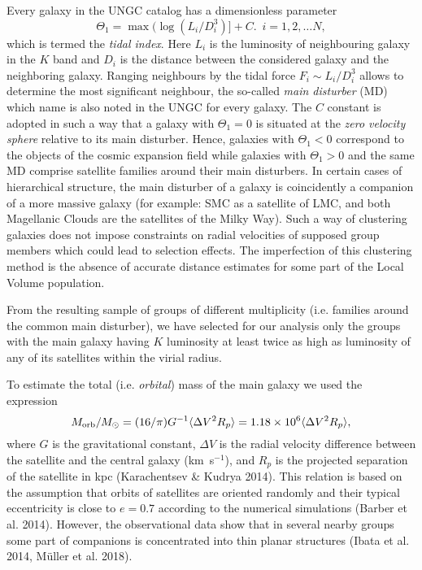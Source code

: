 \documentclass[proof]{WileyASNA-v1}
\begin{document}
Every galaxy in the UNGC catalog has a dimensionless parameter
$$\Theta_1=\max(\log(L_i/D_i^3)]+C. \,\,\, i= 1, 2, \ldots N,$$
which is termed the {\itshape tidal index}. Here $L_i$ is the luminosity of
neighbouring galaxy in the $K$ band and $D_i$ is the distance between the
considered galaxy and the neighboring galaxy. Ranging neighbours by the tidal
force $F_i\sim L_i/D_i^3$ allows to determine the most significant neighbour,
the so-called {\itshape main disturber} (MD) which name is also noted in the
UNGC for every galaxy. The $C$ constant is adopted in such a way that a galaxy
with $\Theta_1=0$ is situated at the {\itshape zero velocity sphere} relative to
its main disturber. Hence, galaxies with $\Theta_1<0$ correspond to the objects
of the cosmic expansion field while galaxies with $\Theta_1>0$ and the same MD
comprise satellite families around their main disturbers. In certain cases of
hierarchical structure, the main disturber of a galaxy is coincidently a
companion of a more massive galaxy (for example: SMC as a satellite of LMC, and
both Magellanic Clouds are the satellites of the Milky Way). Such a way of
clustering galaxies does not impose constraints on radial velocities of supposed
group members which could lead to selection effects. The imperfection of this
clustering method is the absence of accurate distance estimates for some part of
the Local Volume population.

From the resulting sample of groups of different multiplicity (i.e. families
around the common main disturber), we have selected for our analysis only the
groups with the main galaxy having $K$ luminosity at least twice as high as
luminosity of any of its satellites within the virial radius.

To estimate the total (i.e. {\itshape orbital}) mass of the main galaxy we used
the expression
\begin{equation}
M_{\rm orb}/M_{\odot}=(16/\pi) G^{-1}\langle\Delta V^2
R_p\rangle=1.18\times10^6\langle\Delta V^2 R_p\rangle,
\end{equation}
where $G$ is the gravitational constant, $\Delta V$ is the radial velocity
difference between the satellite and the central galaxy (km~s$^{-1}$), and $R_p$
is the projected separation of the satellite in kpc (Karachentsev \& Kudrya
2014). This relation is based on the assumption that orbits of satellites are
oriented randomly and their typical eccentricity is close to $e=0.7$ according
to the numerical simulations (Barber et al. 2014). However, the observational
data show that in several nearby groups some part of companions is concentrated
into thin planar structures (Ibata et al. 2014, M\"{u}ller et al. 2018). 
\end{document}
